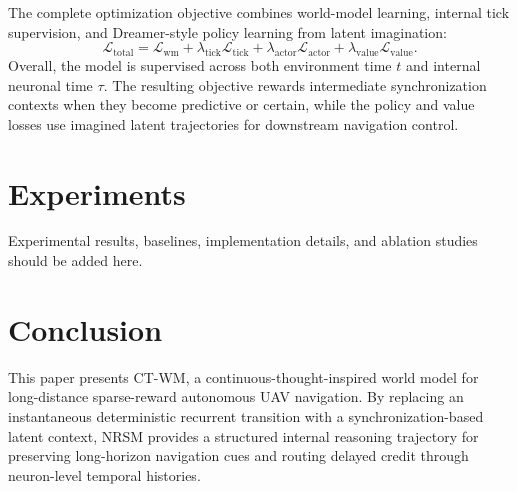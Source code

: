 \documentclass{article}
\begin{document}
The complete optimization objective combines world-model learning, internal tick supervision, and Dreamer-style policy learning from latent imagination:
\begin{equation}
\mathcal L_{\mathrm{total}}
=
\mathcal L_{\mathrm{wm}}
+
\lambda_{\mathrm{tick}}\mathcal L_{\mathrm{tick}}
+
\lambda_{\mathrm{actor}}\mathcal L_{\mathrm{actor}}
+
\lambda_{\mathrm{value}}\mathcal L_{\mathrm{value}}.
\label{eq:total_loss}
\end{equation}
Overall, the model is supervised across both environment time $t$ and internal neuronal time $\tau$. The resulting objective rewards intermediate synchronization contexts when they become predictive or certain, while the policy and value losses use imagined latent trajectories for downstream navigation control.

\section{Experiments}

Experimental results, baselines, implementation details, and ablation studies should be added here.

\section{Conclusion}

This paper presents CT-WM, a continuous-thought-inspired world model for long-distance sparse-reward autonomous UAV navigation. By replacing an instantaneous deterministic recurrent transition with a synchronization-based latent context, NRSM provides a structured internal reasoning trajectory for preserving long-horizon navigation cues and routing delayed credit through neuron-level temporal histories.



\end{document}
